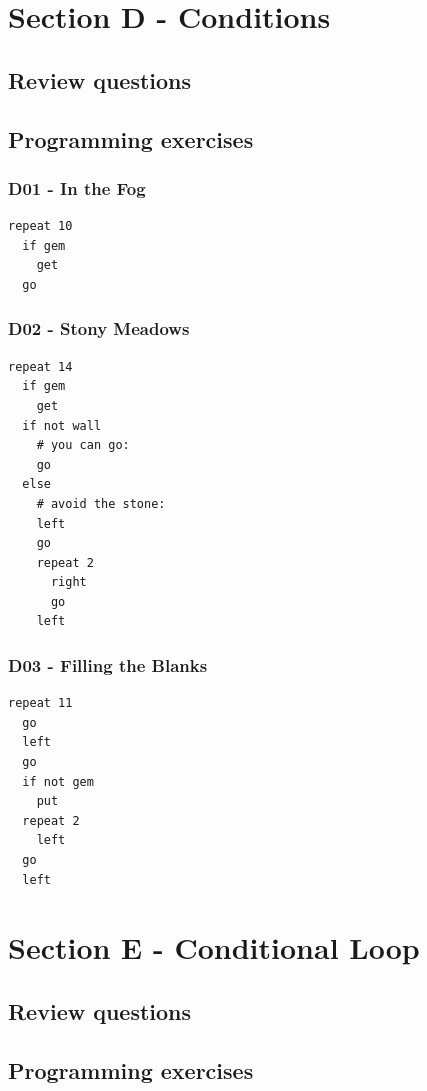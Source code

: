 \documentclass[article,A4,12pt]{llncs}
\begin{document}
\section{Section D - Conditions}

\subsection{Review questions}

\subsection{Programming exercises}

\subsubsection{D01 - In the Fog}
\begin{verbatim}
repeat 10
  if gem
    get
  go
\end{verbatim}

\subsubsection{D02 - Stony Meadows}
\begin{verbatim}
repeat 14
  if gem
    get
  if not wall
    # you can go:
    go
  else
    # avoid the stone:
    left
    go
    repeat 2
      right
      go
    left
\end{verbatim}

\subsubsection{D03 - Filling the Blanks}
\begin{verbatim}
repeat 11
  go
  left
  go
  if not gem
    put
  repeat 2
    left
  go
  left
\end{verbatim}


\section{Section E - Conditional Loop}

\subsection{Review questions}

\subsection{Programming exercises}
\end{document}

